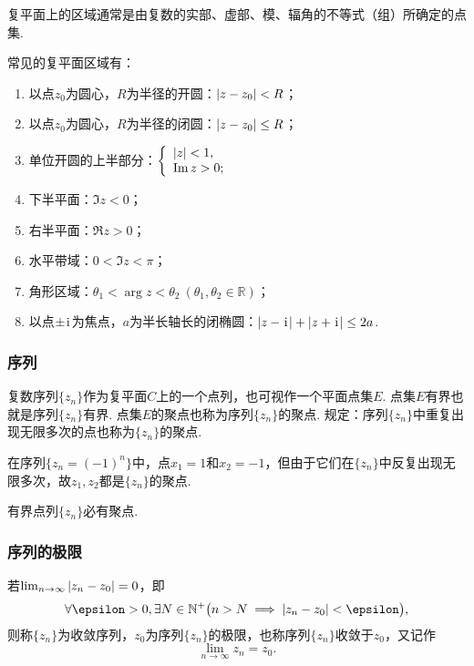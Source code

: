 复平面上的区域通常是由复数的实部、虚部、模、辐角的不等式（组）所确定的点集.
\begin{example}
常见的复平面区域有：\begin{enumerate}
\item 以点\(z_0\)为圆心，\(R\)为半径的开圆：\(\abs{z-z_0}<R\)；
\item 以点\(z_0\)为圆心，\(R\)为半径的闭圆：\(\abs{z-z_0} \leq R\)；
\item 单位开圆的上半部分：\(\left\{ \begin{array}{l}
\abs{z}<1, \\
\Im z > 0;
\end{array} \right.\)
\item 下半平面：\(\Im z < 0\)；
\item 右半平面：\(\Re z > 0\)；
\item 水平带域：\(0 < \Im z < \pi\)；
\item 角形区域：\(\theta_1 < \arg z < \theta_2\ (\theta_1,\theta_2\in\mathbb{R})\)；
\item 以点\(\pm\kern1pt\mathrm{i}\kern1pt\)为焦点，\(a\)为半长轴长的闭椭圆：\(\abs{z-\kern1pt\mathrm{i}\kern1pt}+\abs{z+\kern1pt\mathrm{i}\kern1pt}\leq2a\).
\end{enumerate}
\end{example}

\subsubsection{序列}
\begin{definition}
复数序列\(\{z_n\}\)作为复平面\(C\)上的一个点列，也可视作一个平面点集\(E\).
点集\(E\)有界也就是序列\(\{z_n\}\)有界.
点集\(E\)的聚点也称为序列\(\{z_n\}\)的聚点.
规定：序列\(\{z_n\}\)中重复出现无限多次的点也称为\(\{z_n\}\)的聚点.
\end{definition}

\begin{example}
在序列\(\{z_n = (-1)^n\}\)中，点\(x_1=1\)和\(x_2=-1\)，但由于它们在\(\{z_n\}\)中反复出现无限多次，故\(z_1,z_2\)都是\(\{z_n\}\)的聚点.
\end{example}

\begin{theorem}\label{theorem:复变函数.波莱尔--魏尔斯特拉斯定理}
有界点列\(\{z_n\}\)必有聚点.
\end{theorem}

\subsubsection{序列的极限}
\begin{definition}
若\(\lim_{n \to \infty} \abs{z_n - z_0} = 0\)，即\[
\forall \epsilon > 0, \exists N \in \mathbb{N}^+ \bigl(
n > N \implies \abs{z_n - z_0} < \epsilon
\bigr),
\]则称\(\{z_n\}\)为收敛序列，\(z_0\)为序列\(\{z_n\}\)的极限，也称序列\(\{z_n\}\)收敛于\(z_0\)，又记作\[
\lim_{n \to \infty} z_n = z_0.
\]
\end{definition}

